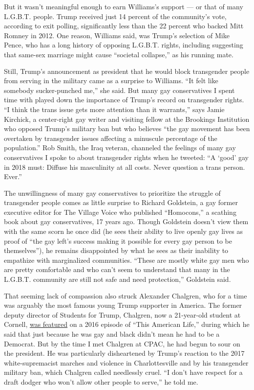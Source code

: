 But it wasn't meaningful enough to earn Williams's support --- or that
of many L.G.B.T. people. Trump received just 14 percent of the
community's vote, according to exit polling, significantly less than the
22 percent who backed Mitt Romney in 2012. One reason, Williams said,
was Trump's selection of Mike Pence, who has a long history of opposing
L.G.B.T. rights, including suggesting that same-sex marriage might cause
``societal collapse,'' as his running mate.

Still, Trump's announcement as president that he would block transgender
people from serving in the military came as a surprise to Williams. ``It
felt like somebody sucker-punched me,'' she said. But many gay
conservatives I spent time with played down the importance of Trump's
record on transgender rights. ``I think the trans issue gets more
attention than it warrants,'' says Jamie Kirchick, a center-right gay
writer and visiting fellow at the Brookings Institution who opposed
Trump's military ban but who believes ``the gay movement has been
overtaken by transgender issues affecting a minuscule percentage of the
population.'' Rob Smith, the Iraq veteran, channeled the feelings of
many gay conservatives I spoke to about transgender rights when he
tweeted: ``A `good' gay in 2018 must: Diffuse his masculinity at all
costs. Never question a trans person. Ever.''

The unwillingness of many gay conservatives to prioritize the struggle
of transgender people comes as little surprise to Richard Goldstein, a
gay former executive editor for The Village Voice who published
``Homocons,'' a scathing book about gay conservatives, 17 years ago.
Though Goldstein doesn't view them with the same scorn he once did (he
sees their ability to live openly gay lives as proof of ``the gay left's
success making it possible for every gay person to be themselves''), he
remains disappointed by what he sees as their inability to empathize
with marginalized communities. ``These are mostly white gay men who are
pretty comfortable and who can't seem to understand that many in the
L.G.B.T. community are still not safe and need protection,'' Goldstein
said.

That seeming lack of compassion also struck Alexander Chalgren, who for
a time was arguably the most famous young Trump supporter in America.
The former deputy director of Students for Trump, Chalgren, now a
21-year-old student at Cornell,
\href{https://www.thisamericanlife.org/580/thats-one-way-to-do-it}{was
featured} on a 2016 episode of ``This American Life,'' during which he
said that just because he was gay and black didn't mean he had to be a
Democrat. But by the time I met Chalgren at CPAC, he had begun to sour
on the president. He was particularly disheartened by Trump's reaction
to the 2017 white-supremacist marches and violence in Charlottesville
and by his transgender military ban, which Chalgren called needlessly
cruel. ``I don't have respect for a draft dodger who won't allow other
people to serve,'' he told me.


